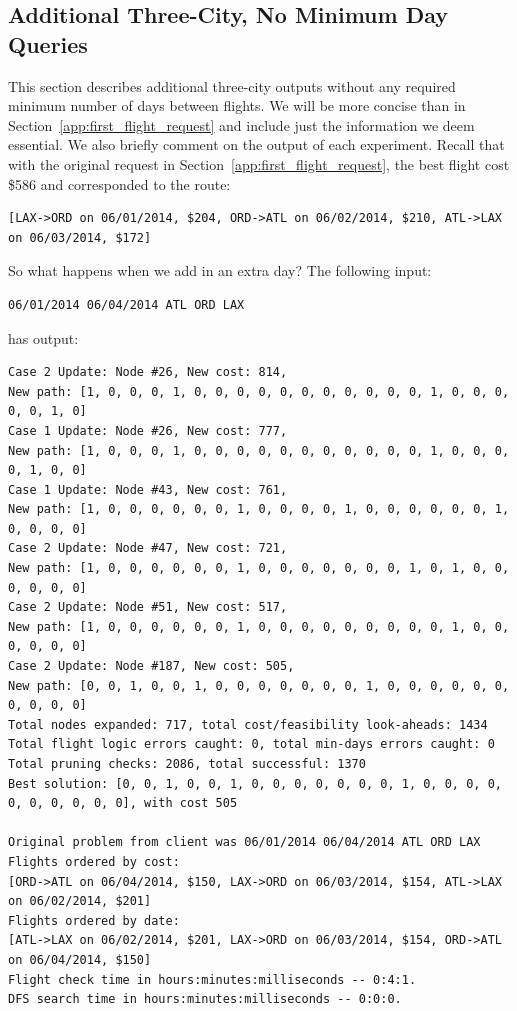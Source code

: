 \documentclass{article}
\begin{document}
\subsection{Additional Three-City, No Minimum Day Queries}\label{app:three_city}

This section describes additional three-city outputs without any required minimum number of days between flights. We will be more concise than in
Section~\ref{app:first_flight_request} and include just the information we deem essential. We also briefly comment on the output of each experiment.
Recall that with the original request in Section~\ref{app:first_flight_request}, the best flight cost \$586 and corresponded to the route:

\footnotesize
\begin{verbatim}
[LAX->ORD on 06/01/2014, $204, ORD->ATL on 06/02/2014, $210, ATL->LAX on 06/03/2014, $172] 
\end{verbatim}
\normalsize

So what happens when we add in an extra day? The following input:

\begin{verbatim}
06/01/2014 06/04/2014 ATL ORD LAX
\end{verbatim}

has output:

\scriptsize
\begin{verbatim}
Case 2 Update: Node #26, New cost: 814, 
New path: [1, 0, 0, 0, 1, 0, 0, 0, 0, 0, 0, 0, 0, 0, 0, 0, 1, 0, 0, 0, 0, 0, 1, 0]
Case 1 Update: Node #26, New cost: 777, 
New path: [1, 0, 0, 0, 1, 0, 0, 0, 0, 0, 0, 0, 0, 0, 0, 0, 1, 0, 0, 0, 0, 1, 0, 0]
Case 1 Update: Node #43, New cost: 761, 
New path: [1, 0, 0, 0, 0, 0, 0, 1, 0, 0, 0, 0, 1, 0, 0, 0, 0, 0, 0, 1, 0, 0, 0, 0]
Case 2 Update: Node #47, New cost: 721, 
New path: [1, 0, 0, 0, 0, 0, 0, 1, 0, 0, 0, 0, 0, 0, 0, 1, 0, 1, 0, 0, 0, 0, 0, 0]
Case 2 Update: Node #51, New cost: 517, 
New path: [1, 0, 0, 0, 0, 0, 0, 1, 0, 0, 0, 0, 0, 0, 0, 0, 0, 1, 0, 0, 0, 0, 0, 0]
Case 2 Update: Node #187, New cost: 505, 
New path: [0, 0, 1, 0, 0, 1, 0, 0, 0, 0, 0, 0, 0, 1, 0, 0, 0, 0, 0, 0, 0, 0, 0, 0]
Total nodes expanded: 717, total cost/feasibility look-aheads: 1434
Total flight logic errors caught: 0, total min-days errors caught: 0
Total pruning checks: 2086, total successful: 1370
Best solution: [0, 0, 1, 0, 0, 1, 0, 0, 0, 0, 0, 0, 0, 1, 0, 0, 0, 0, 0, 0, 0, 0, 0, 0], with cost 505

Original problem from client was 06/01/2014 06/04/2014 ATL ORD LAX
Flights ordered by cost:
[ORD->ATL on 06/04/2014, $150, LAX->ORD on 06/03/2014, $154, ATL->LAX on 06/02/2014, $201]
Flights ordered by date:
[ATL->LAX on 06/02/2014, $201, LAX->ORD on 06/03/2014, $154, ORD->ATL on 06/04/2014, $150]
Flight check time in hours:minutes:milliseconds -- 0:4:1.
DFS search time in hours:minutes:milliseconds -- 0:0:0.
\end{verbatim}
\normalsize
\end{document}
